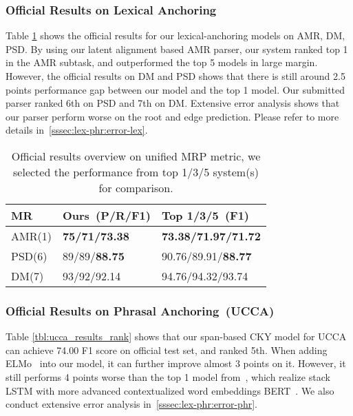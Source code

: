 \subsubsection{Official Results on Lexical Anchoring}
\label{sssec:lex-phr:lex-results}
Table \ref{tbl:results_rank} shows the official results for our
lexical-anchoring models on AMR, DM, PSD.  By using our latent
alignment based AMR parser, our system ranked top 1 in the AMR
subtask, and outperformed the top 5 models in large margin. However,
the official results on DM and PSD shows that there is still around
2.5 points performance gap between our model and the top 1 model. Our
submitted parser ranked 6th on PSD and 7th on DM. Extensive error
analysis shows that our parser perform worse on the root and edge
prediction. Please refer to more details
in~\autoref{sssec:lex-phr:error-lex}.

\begin{table}[!tbp]
\caption{\label{tbl:results_rank} Official results overview on unified MRP metric, we selected the performance from top 1/3/5 system(s) for comparison.}
\begin{center}
\begin{tabular}{lll}
\toprule
MR     & Ours~(P/R/F1) & Top 1/3/5~(F1)  \\ \hline
AMR(1) & {\bf 75/71/73.38}   & {\bf 73.38/71.97/71.72} \\
PSD(6) & 89/89/{\bf 88.75}   & 90.76/89.91/{\bf 88.77} \\
DM(7)  & 93/92/92.14   & 94.76/94.32/93.74 \\ \hline
\end{tabular}
\end{center}
\end{table}

\subsubsection{Official Results on Phrasal Anchoring~(UCCA)}
\label{sssec:lex-phr:ucca-results}
Table \ref{tbl:ucca_results_rank} shows that our span-based CKY model
for UCCA can achieve 74.00 F1 score on official test set, and ranked
5th. When adding ELMo~\cite{peters2018deep} into our model, it can
further improve almost 3 points on it. However, it still performs 4
points worse than the top 1 model from~\cite{Che:Dou:Xu:19}, which
realize stack LSTM with more advanced contextualized word embeddings
BERT~\cite{devlin2019bert}. We also conduct extensive error analysis
in~\autoref{sssec:lex-phr:error-phr}.

